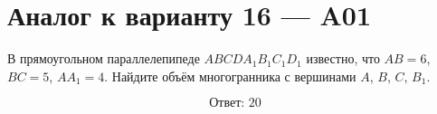 \documentclass[12pt,a4paper]{article}
\begin{document}
\section*{Аналог к варианту 16 — A01}

В прямоугольном параллелепипеде \(ABCDA_1B_1C_1D_1\) известно, что \(AB=6\), \(BC=5\), \(AA_1=4\). Найдите объём многогранника с вершинами \(A\), \(B\), \(C\), \(B_1\).

\begin{center}
\end{center}

\[
\boxed{\text{Ответ: }20}
\]
\end{document}
